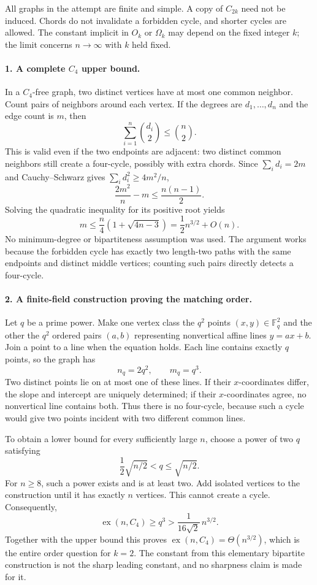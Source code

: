 \documentclass[11pt]{article}
\begin{document}
All graphs in the attempt are finite and simple. A copy of $C_{2k}$ need not be induced. Chords do not invalidate a forbidden cycle, and shorter cycles are allowed. The constant implicit in $O_k$ or $\Omega_k$ may depend on the fixed integer $k$; the limit concerns $n\to\infty$ with $k$ held fixed.

\paragraph{1. A complete $C_4$ upper bound.}
In a $C_4$-free graph, two distinct vertices have at most one common neighbor. Count pairs of neighbors around each vertex. If the degrees are $d_1,\ldots,d_n$ and the edge count is $m$, then
\[
 \sum_{i=1}^n\binom{d_i}{2}\le\binom n2.
\]
This is valid even if the two endpoints are adjacent: two distinct common neighbors still create a four-cycle, possibly with extra chords. Since $\sum_i d_i=2m$ and Cauchy--Schwarz gives $\sum_i d_i^2\ge4m^2/n$,
\[
 \frac{2m^2}{n}-m\le\frac{n(n-1)}2.
\]
Solving the quadratic inequality for its positive root yields
\[
 m\le\frac n4\left(1+\sqrt{4n-3}\right)
    =\frac12n^{3/2}+O(n).
\]
No minimum-degree or bipartiteness assumption was used. The argument works because the forbidden cycle has exactly two length-two paths with the same endpoints and distinct middle vertices; counting such pairs directly detects a four-cycle.

\paragraph{2. A finite-field construction proving the matching order.}
Let $q$ be a prime power. Make one vertex class the $q^2$ points $(x,y)\in\mathbb F_q^2$ and the other the $q^2$ ordered pairs $(a,b)$ representing nonvertical affine lines $y=ax+b$. Join a point to a line when the equation holds. Each line contains exactly $q$ points, so the graph has
\[
 n_q=2q^2,\qquad m_q=q^3.
\]
Two distinct points lie on at most one of these lines. If their $x$-coordinates differ, the slope and intercept are uniquely determined; if their $x$-coordinates agree, no nonvertical line contains both. Thus there is no four-cycle, because such a cycle would give two points incident with two different common lines.

To obtain a lower bound for every sufficiently large $n$, choose a power of two $q$ satisfying
\[
 \frac12\sqrt{n/2}<q\le\sqrt{n/2}.
\]
For $n\ge8$, such a power exists and is at least two. Add isolated vertices to the construction until it has exactly $n$ vertices. This cannot create a cycle. Consequently,
\[
 \operatorname{ex}(n,C_4)\ge q^3>
       \frac{1}{16\sqrt2}\,n^{3/2}.
\]
Together with the upper bound this proves $\operatorname{ex}(n,C_4)=\Theta(n^{3/2})$, which is the entire order question for $k=2$. The constant from this elementary bipartite construction is not the sharp leading constant, and no sharpness claim is made for it.
\end{document}
